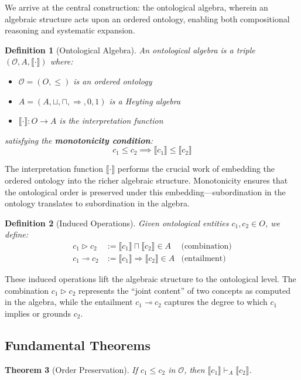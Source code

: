 \documentclass[12pt,a4paper]{article}
\newtheorem{definition}{Definition}[section]
\newtheorem{theorem}[definition]{Theorem}
\newcommand{\onto}{\mathcal{O}}
\newcommand{\sem}[1]{\llbracket #1 \rrbracket}
\begin{document}
We arrive at the central construction: the ontological algebra, wherein an algebraic structure acts upon an ordered ontology, enabling both compositional reasoning and systematic expansion.

\begin{definition}[Ontological Algebra]
An \emph{ontological algebra} is a triple $(\onto, A, \sem{\cdot})$ where:
\begin{itemize}
    \item $\onto = (O, \leq)$ is an ordered ontology
    \item $A = (A, \sqcup, \sqcap, \Rightarrow, 0, 1)$ is a Heyting algebra
    \item $\sem{\cdot} : O \to A$ is the \emph{interpretation function}
\end{itemize}
satisfying the \textbf{monotonicity condition}:
$$
c_1 \leq c_2 \implies \sem{c_1} \leq \sem{c_2}
$$
\end{definition}

The interpretation function $\sem{\cdot}$ performs the crucial work of embedding the ordered ontology into the richer algebraic structure. Monotonicity ensures that the ontological order is preserved under this embedding---subordination in the ontology translates to subordination in the algebra.

\begin{definition}[Induced Operations]
Given ontological entities $c_1, c_2 \in O$, we define:
\begin{align*}
    c_1 \triangleright c_2 &:= \sem{c_1} \sqcap \sem{c_2} \in A & \text{(combination)}\\
    c_1 \multimap c_2 &:= \sem{c_1} \Rightarrow \sem{c_2} \in A & \text{(entailment)}
\end{align*}
\end{definition}

These induced operations lift the algebraic structure to the ontological level. The combination $c_1 \triangleright c_2$ represents the ``joint content'' of two concepts as computed in the algebra, while the entailment $c_1 \multimap c_2$ captures the degree to which $c_1$ implies or grounds $c_2$.

\subsection{Fundamental Theorems}

\begin{theorem}[Order Preservation]
If $c_1 \leq c_2$ in $\onto$, then $\sem{c_1} \vdash_A \sem{c_2}$.
\end{theorem}
\end{document}
